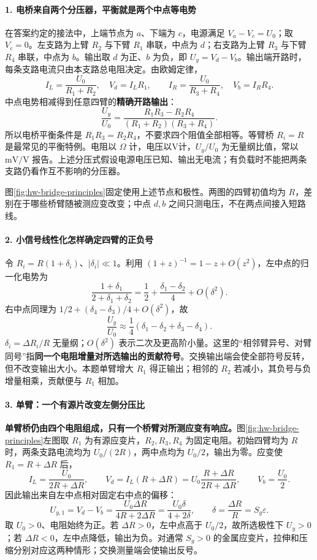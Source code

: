 \paragraph{1. 电桥来自两个分压器，平衡就是两个中点等电势}
在答案约定的接法中，上端节点为 $a$、下端为 $c$，电源满足 $V_a-V_c=U_0$；取 $V_c=0$。左支路为上臂 $R_2$ 与下臂 $R_1$ 串联，中点为 $d$；右支路为上臂 $R_3$ 与下臂 $R_4$ 串联，中点为 $b$。输出取 $d$ 为正、$b$ 为负，即 $U_y=V_d-V_b$。输出端开路时，每条支路电流只由本支路总电阻决定。由欧姆定律，
\[
I_L=\frac{U_0}{R_1+R_2},\quad V_d=I_LR_1,\qquad
I_R=\frac{U_0}{R_3+R_4},\quad V_b=I_RR_4.
\]
中点电势相减得到任意四臂的\textbf{精确开路输出}：
\[
\boxed{\frac{U_y}{U_0}
=\frac{R_1R_3-R_2R_4}{(R_1+R_2)(R_3+R_4)}}.
\]
所以电桥平衡条件是 $R_1R_3=R_2R_4$，不要求四个阻值全部相等。等臂桥 $R_i=R$ 是最常见的平衡特例。电阻以 $\Omega$ 计，电压以V计，$U_y/U_0$ 为无量纲比值，常以 $\mathrm{mV/V}$ 报告。上述分压式假设电源电压已知、输出无电流；有负载时不能把两条支路仍看作互不影响的分压器。


图\ref{fig:hw-bridge-principles}固定使用上述节点和极性。两图的四臂初值均为 $R$，差别在于哪些桥臂随被测应变改变；中点 $d,b$ 之间只测电压，不在两点间接入短路线。

\paragraph{2. 小信号线性化怎样确定四臂的正负号}
令 $R_i=R(1+\delta_i)$、$|\delta_i|\ll1$。利用
$(1+z)^{-1}=1-z+O(z^2)$，左中点的归一化电势为
\[
\frac{1+\delta_1}{2+\delta_1+\delta_2}
=\frac12+\frac{\delta_1-\delta_2}{4}+O(\delta^2).
\]
右中点同理为 $1/2+(\delta_4-\delta_3)/4+O(\delta^2)$，故
\[
\boxed{\frac{U_y}{U_0}\approx
\frac14(\delta_1-\delta_2+\delta_3-\delta_4)}.
\]
$\delta_i=\Delta R_i/R$ 无量纲；$O(\delta^2)$ 表示二次及更高阶小量。这里的“相邻臂异号、对臂同号”指\textbf{同一个电阻增量对所选输出的贡献符号}。交换输出端会使全部符号反转，但不改变输出大小。本题单臂增大 $R_1$ 得正输出；相邻的 $R_2$ 若减小，其负号与负增量相乘，贡献便与 $R_1$ 相加。

\paragraph{3. 单臂：一个有源片改变左侧分压比}
\textbf{单臂桥仍由四个电阻组成，只有一个桥臂对所测应变有响应。}图\ref{fig:hw-bridge-principles}左图取 $R_1$ 为有源应变片，$R_2,R_3,R_4$ 为固定电阻。初始四臂均为 $R$ 时，两条支路电流均为 $U_0/(2R)$，两中点均为 $U_0/2$，输出为零。应变使 $R_1=R+\Delta R$ 后，
\[
I_L=\frac{U_0}{2R+\Delta R},\qquad
V_d=I_L(R+\Delta R)=U_0\frac{R+\Delta R}{2R+\Delta R},
\qquad V_b=\frac{U_0}{2}.
\]
因此输出来自左中点相对固定右中点的偏移：
\[
U_{y,1}=V_d-V_b
=\boxed{\frac{U_0\Delta R}{4R+2\Delta R}
=\frac{U_0\delta}{4+2\delta}},\qquad
\delta=\frac{\Delta R}{R}=S_g\varepsilon.
\]
取 $U_0>0$、电阻始终为正。若 $\Delta R>0$，左中点高于 $U_0/2$，故所选极性下 $U_y>0$；若 $\Delta R<0$，左中点降低，输出为负。对通常 $S_g>0$ 的金属应变片，拉伸和压缩分别对应这两种情形；交换测量端会使输出反号。

